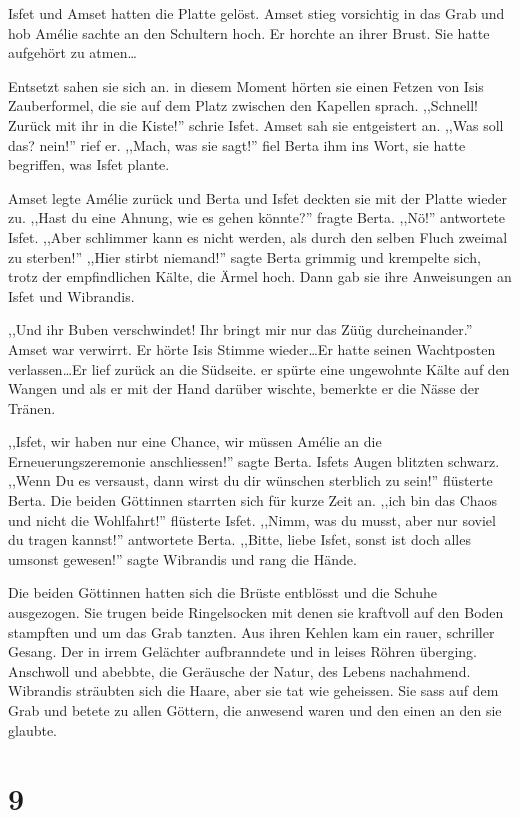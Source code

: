 \documentclass[11pt,titlepage,a5paper]{book}
\begin{document}
Isfet und Amset hatten die Platte gelöst. Amset stieg vorsichtig in das Grab und hob Amélie sachte an den Schultern hoch. Er horchte an ihrer Brust. Sie hatte aufgehört zu atmen\dots

Entsetzt sahen sie sich an. in diesem Moment hörten sie einen Fetzen von Isis Zauberformel, die sie auf dem Platz zwischen den Kapellen sprach. ,,Schnell! Zurück mit ihr in die Kiste!'' schrie Isfet. Amset sah sie entgeistert an. ,,Was soll das? nein!'' rief er. ,,Mach, was sie sagt!'' fiel Berta ihm ins Wort, sie hatte begriffen, was Isfet plante. 

Amset legte Amélie zurück und Berta und Isfet deckten sie mit der Platte wieder zu. ,,Hast du eine Ahnung, wie es gehen könnte?'' fragte Berta. ,,Nö!'' antwortete Isfet. ,,Aber schlimmer kann es nicht werden, als durch den selben Fluch zweimal zu sterben!'' ,,Hier stirbt niemand!'' sagte Berta grimmig und krempelte sich, trotz der empfindlichen Kälte, die Ärmel hoch. Dann gab sie ihre Anweisungen an Isfet und Wibrandis.

,,Und ihr Buben verschwindet! Ihr bringt mir nur das Züüg durcheinander.'' Amset war verwirrt. Er hörte Isis Stimme wieder\dots Er hatte seinen Wachtposten verlassen\dots Er lief zurück an die Südseite. er spürte eine ungewohnte Kälte auf den Wangen und als er mit der Hand darüber wischte, bemerkte er die Nässe der Tränen. 

,,Isfet, wir haben nur eine Chance, wir müssen Amélie an die Erneuerungszeremonie anschliessen!'' sagte Berta. Isfets Augen blitzten schwarz. ,,Wenn Du es versaust, dann wirst du dir wünschen sterblich zu sein!'' flüsterte Berta. Die beiden Göttinnen starrten sich für kurze Zeit an. ,,ich bin das Chaos und nicht die Wohlfahrt!'' flüsterte Isfet. ,,Nimm, was du musst, aber nur soviel du tragen kannst!'' antwortete Berta. ,,Bitte, liebe Isfet, sonst ist doch alles umsonst gewesen!'' sagte Wibrandis und rang die Hände.

Die beiden Göttinnen hatten sich die Brüste entblösst und die Schuhe ausgezogen. Sie trugen beide Ringelsocken mit denen sie kraftvoll auf den Boden stampften und um das Grab tanzten. Aus ihren Kehlen kam ein rauer, schriller Gesang. Der in irrem Gelächter aufbranndete und in leises Röhren überging. Anschwoll und abebbte, die Geräusche der Natur, des Lebens nachahmend. Wibrandis sträubten sich die Haare, aber sie tat wie geheissen. Sie sass auf dem Grab und betete zu allen Göttern, die anwesend waren und den einen an den sie glaubte.

\section*{9}
\end{document}
